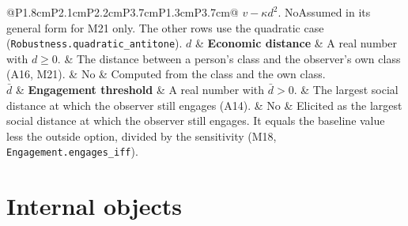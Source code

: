 \documentclass[11pt]{article}
\newcommand{\mm}[6]{#1 & \textbf{#2} & #3 & #4 & #5 & #6 \\ \addlinespace}
\newcommand{\lean}[1]{\texttt{\footnotesize #1}}
\begin{document}
\begin{longtable}{@{}P{1.8cm}P{2.1cm}P{2.2cm}P{3.7cm}P{1.3cm}P{3.7cm}@{}}
{  $v-\kappa d^2$.}
  {No}{Assumed in its general form for M21 only. The other rows use the
  quadratic case (\lean{Robustness.quadratic\_antitone}).}
\mm{$d$}{Economic distance}{A real number with $d\ge0$.}{The distance between a
  person's class and the observer's own class (A16, M21).}
  {No}{Computed from the class and the own class.}
\mm{$\bar d$}{Engagement threshold}{A real number with $\bar d>0$.}{The
  largest social distance at which the observer still engages (A14).}
  {No}{Elicited as the largest social distance at which the observer
  still engages. It equals the baseline value less the outside option,
  divided by the sensitivity (M18, \lean{Engagement.engages\_iff}).}
\end{longtable}
\normalsize

\section*{Internal objects}
\end{document}
